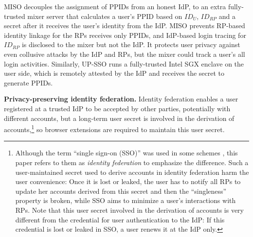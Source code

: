 MISO \cite{miso} decouples the assignment of PPIDs from an honest IdP,
 to an extra fully-trusted mixer server that calculates a user's PPID based on $ID_U$, $ID_{RP}$ and a secret after it receives the user's identity from the IdP.
MISO prevents RP-based identity linkage for the RPs receives only PPIDs,
    and IdP-based login tracing for $ID_{RP}$ is disclosed to the mixer but not the IdP.
It protects user privacy against even collusive attacks by the IdP and RPs,
    but the mixer could track a user's all login activities.
Similarly, UP-SSO \cite{up-sso} runs a fully-trusted Intel SGX enclave on the user side,
 which is remotely attested by the IdP and receives the secret to generate PPIDs. %

\noindent\textbf{Privacy-preserving identity federation.}
Identity federation enables a user registered at a trusted IdP to be accepted by other parties, potentially with different accounts,
but %
a long-term user secret is involved in the derivation of accounts,\footnote{Although the term ``single sign-on (SSO)'' was used in some schemes \cite{PseudoID, Opaak, ELPASSO, WangWS13, HanCSTW18, HanCSTWW20}, this paper refers to them as \emph{identity federation} to emphasize the difference.
Such a user-maintained secret used to derive accounts in identity federation harm the user convenience:
Once it is lost or leaked, the user has to notify all RPs to update her accounts derived from this secret %
    and then the ``singleness'' property is broken,
while SSO aims to minimize a user's interactions with RPs.
Note that this user secret involved in the derivation of accounts is very different from the credential for user authentication to the IdP: If this credential is lost or leaked in SSO, a user  renews it at the IdP only.}
 so browser extensions are required to maintain this user secret.






